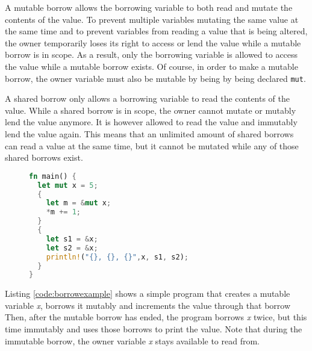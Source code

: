 A mutable borrow allows the borrowing variable to both read and mutate the contents of the value.
To prevent multiple variables mutating the same value at the same time and to prevent variables from reading a value that is being altered, the owner temporarily loses its right to access or lend the value while a mutable borrow is in scope.
As a result, only the borrowing variable is allowed to access the value while a mutable borrow exists.
Of course, in order to make a mutable borrow, the owner variable must also be mutable by being by being declared \texttt{mut}.

A shared borrow only allows a borrowing variable to read the contents of the value.
While a shared borrow is in scope, the owner cannot mutate or mutably lend the value anymore.
It is however allowed to read the value and immutably lend the value again.
This means that an unlimited amount of shared borrows can read a value at the same time, but it cannot be mutated while any of those shared borrows exist.

\begin{figure}[h]
\begin{lstlisting}[language=Rust,frame=single,caption=Borrowing an integer.,label=code:borrowexample]
fn main() {
  let mut x = 5;
  {
    let m = &mut x;
    *m += 1;
  }
  {
    let s1 = &x;
    let s2 = &x;
    println!("{}, {}, {}",x, s1, s2);
  }
}
\end{lstlisting}
\end{figure}

Listing \ref{code:borrowexample} shows a simple program that creates a mutable variable \textit{x}, borrows it mutably and increments the value through that borrow 
Then, after the mutable borrow has ended, the program borrows \textit{x} twice, but this time immutably and uses those borrows to print the value. Note that during the immutable borrow, the owner variable \textit{x} stays available to read from.

